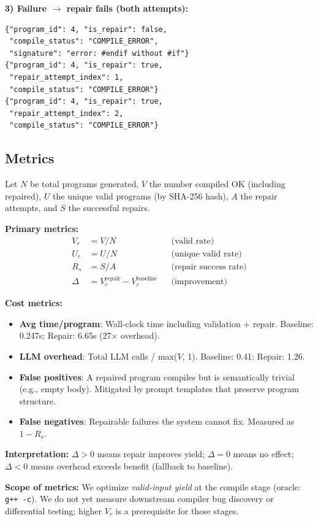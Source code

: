 \documentclass[conference]{IEEEtran}
\begin{document}
\textbf{3) Failure $\to$ repair fails (both attempts):}
\begin{lstlisting}
{"program_id": 4, "is_repair": false,
 "compile_status": "COMPILE_ERROR",
 "signature": "error: #endif without #if"}
{"program_id": 4, "is_repair": true,
 "repair_attempt_index": 1,
 "compile_status": "COMPILE_ERROR"}
{"program_id": 4, "is_repair": true,
 "repair_attempt_index": 2,
 "compile_status": "COMPILE_ERROR"}
\end{lstlisting}

\subsection{Metrics}

Let $N$ be total programs generated, $V$ the number compiled OK (including repaired), $U$ the unique valid programs (by SHA-256 hash), $A$ the repair attempts, and $S$ the successful repairs.

\textbf{Primary metrics:}
\begin{align}
V_r &= V / N && \text{(valid rate)} \\
U_r &= U / N && \text{(unique valid rate)} \\
R_s &= S / A && \text{(repair success rate)} \\
\Delta &= V_r^{\text{repair}} - V_r^{\text{baseline}} && \text{(improvement)}
\end{align}

\textbf{Cost metrics:}
\begin{itemize}
    \item \textbf{Avg time/program}: Wall-clock time including validation + repair. Baseline: 0.247s; Repair: 6.65s (27$\times$ overhead).
    \item \textbf{LLM overhead}: Total LLM calls / max($V$, 1). Baseline: 0.41; Repair: 1.26.
    \item \textbf{False positives}: A repaired program compiles but is semantically trivial (e.g., empty body). Mitigated by prompt templates that preserve program structure.
    \item \textbf{False negatives}: Repairable failures the system cannot fix. Measured as $1 - R_s$.
\end{itemize}

\textbf{Interpretation:} $\Delta > 0$ means repair improves yield; $\Delta = 0$ means no effect; $\Delta < 0$ means overhead exceeds benefit (fallback to baseline).

\noindent\textbf{Scope of metrics:} We optimize \emph{valid-input yield} at the compile stage (oracle: \texttt{g++ -c}). We do not yet measure downstream compiler bug discovery or differential testing; higher $V_r$ is a prerequisite for those stages.
\end{document}
